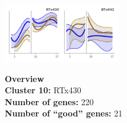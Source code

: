 \begin{multicols}{2}
\includegraphics[width=2in]{figures/clusters/root_Preflowering_9.png}
\columnbreak

\noindent \textbf{Overview}\\\textbf{Cluster 10:} RTx430 \\
\textbf{Number of genes:} 220 \\
\textbf{Number of ``good'' genes:} 21 \\
\end{multicols}

